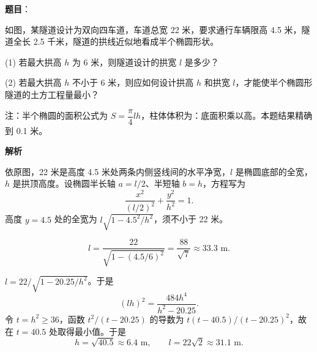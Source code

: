 \begin{answer}

\textbf{题目}：

如图，某隧道设计为双向四车道，车道总宽 22 米，要求通行车辆限高 4.5 米，隧道全长 2.5 千米，隧道的拱线近似地看成半个椭圆形状。

    (1) 若最大拱高 \(h\) 为 6 米，则隧道设计的拱宽 \(l\) 是多少？

    (2) 若最大拱高 \(h\) 不小于 6 米，则应如何设计拱高 \(h\) 和拱宽 \(l\)，才能使半个椭圆形隧道的土方工程量最小？

    注：半个椭圆的面积公式为 \(S=\dfrac{\pi}{4}lh\)，柱体体积为：底面积乘以高。本题结果精确到 0.1 米。
\nopagebreak[4]
\begin{center}\end{center}
\nopagebreak[4]
\textbf{解析}

依原图，22 米是高度 4.5 米处两条内侧竖线间的水平净宽，\(l\) 是椭圆底部的全宽，\(h\) 是拱顶高度。设椭圆半长轴 \(a=l/2\)、半短轴 \(b=h\)，方程写为
\nopagebreak[4]
\[
\frac{x^2}{(l/2)^2}+\frac{y^2}{h^2}=1.
\]
高度 \(y=4.5\) 处的全宽为 \(l\sqrt{1-4.5^2/h^2}\)，须不小于 22 米。

\nopagebreak[4]
\[
l=\frac{22}{\sqrt{1-(4.5/6)^2}}=\frac{88}{\sqrt7}\approx33.3\text{ m}.
\]

\(l=22/\sqrt{1-20.25/h^2}\)。于是
\nopagebreak[4]
\[
(lh)^2=\frac{484h^4}{h^2-20.25}.
\]
令 \(t=h^2\ge36\)，函数 \(t^2/(t-20.25)\) 的导数为
\(t(t-40.5)/(t-20.25)^2\)，故在 \(t=40.5\) 处取得最小值。于是
\nopagebreak[4]
\[
h=\sqrt{40.5}\approx6.4\text{ m},\qquad l=22\sqrt2\approx31.1\text{ m}.
\]



\end{answer}
